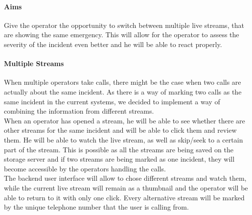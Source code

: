 \documentclass{article}
\begin{document}
			\paragraph{Aims}
			Give the operator the opportunity to switch between multiple live streams, that are showing the same emergency. This will allow for the operator to assess the severity of the incident even better and he will be able to react properly.
			
			\paragraph{Multiple Streams}
			When multiple operators take calls, there might be the case when two calls are actually about the same incident. As there is a way of marking two calls as the same incident in the current systems, we decided to implement a way of combining the information from different streams.\\

When an operator has opened a stream, he will be able to see whether there are other streams for the same incident and will be able to click them and review them. He will be able to watch the live stream, as well as skip/seek to a certain part of the stream. This is possible as all the streams are being saved on the storage server and if two streams are being marked as one incident, they will become accessible by the operators handling the calls.\\

The backend user interface will allow to chose different streams and watch them, while the current live stream will remain as a thumbnail and the operator will be able to return to it with only one click. Every alternative stream will be marked by the unique telephone number that the user is calling from.\\
\end{document}
